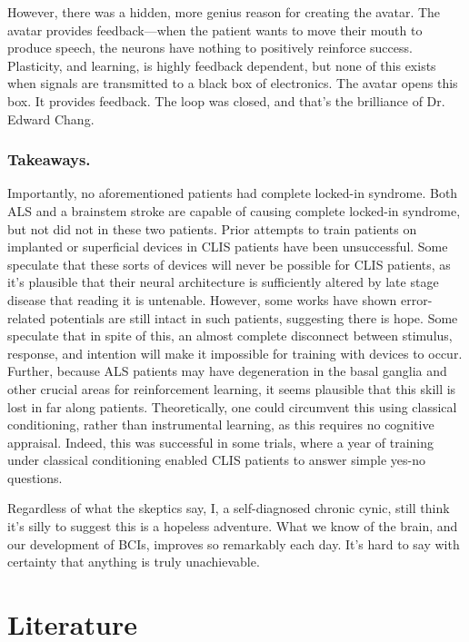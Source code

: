 However, there was a hidden, more genius reason for creating the avatar. The avatar provides feedback---when the patient wants to move their mouth to produce speech, the neurons have nothing to positively reinforce success. Plasticity, and learning, is highly feedback dependent, but none of this exists when signals are transmitted to a black box of electronics. The avatar opens this box. It provides feedback. The loop was closed, and that's the brilliance of Dr. Edward Chang. 

\subsubsection{Takeaways.}

Importantly, no aforementioned patients had complete locked-in syndrome. Both ALS and a brainstem stroke are capable of causing complete locked-in syndrome, but not did not in these two patients. Prior attempts to train patients on implanted or superficial devices in CLIS patients have been unsuccessful. Some speculate that these sorts of devices will never be possible for CLIS patients, as it's plausible that their neural architecture is sufficiently altered by late stage disease that reading it is untenable. However, some works have shown error-related potentials are still intact in such patients, suggesting there is hope. Some speculate that in spite of this, an almost complete disconnect between stimulus, response, and intention will make it impossible for training with devices to occur. Further, because ALS patients may have degeneration in the basal ganglia and other crucial areas for reinforcement learning, it seems plausible that this skill is lost in far along patients. Theoretically, one could circumvent this using classical conditioning, rather than instrumental learning, as this requires no cognitive appraisal. Indeed, this was successful in some trials, where a year of training under classical conditioning enabled CLIS patients to answer simple yes-no questions. \newline

Regardless of what the skeptics say, I, a self-diagnosed chronic cynic, still think it's silly to suggest this is a hopeless adventure. What we know of the brain, and our development of BCIs, improves so remarkably each day. It's hard to say with certainty that anything is truly unachievable.  

\section{Literature}

